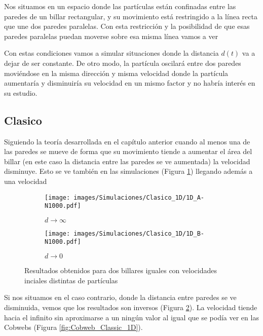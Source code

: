 Nos situamos en un espacio donde las partículas están confinadas entre las paredes de un billar rectangular, y su movimiento está restringido a la línea recta que une dos paredes paralelas. Con esta restricción y la posibilidad de que esas paredes paralelas puedan moverse sobre esa misma línea vamos a ver 

\vspace{3mm}

Con estas condiciones vamos a simular situaciones donde la distancia \( d(t) \) va a dejar de ser constante. De otro modo, la partícula oscilará entre dos paredes moviéndose en la misma dirección y misma velocidad donde la partícula aumentaría y disminuiría su velocidad en un mismo factor y no habría interés en su estudio.

\subsection{Clasico}

Siguiendo la teoría desarrollada en el capítulo anterior cuando al menos una de las paredes se mueve de forma que su movimiento tiende a aumentar el área del billar (en este caso la distancia entre las paredes se ve aumentada) la velocidad disminuye. Esto se ve también en las simulaciones (Figura \ref{fig:clasico_1D_A}) llegando además a una velocidad 

\begin{figure}[!h]
    \begin{subfigure}[b]{0.5\textwidth}
        \centering
        \texttt{[image: images/Simulaciones/Clasico\_1D/1D\_A-N1000.pdf]}
        \caption{\( d \rightarrow \infty \)}
        \label{fig:clasico_1D_A}
    \end{subfigure}
    \hfill
    \begin{subfigure}[b]{0.5\textwidth}
        \centering
        \texttt{[image: images/Simulaciones/Clasico\_1D/1D\_B-N1000.pdf]}
        \caption{\( d \rightarrow 0 \)}
        \label{fig:clasico_1D_B}
    \end{subfigure}
    \caption{Resultados obtenidos para dos billares iguales con velocidades inciales distintas de partículas}
    \label{fig:clasico_1D}
\end{figure}

Si nos situamos en el caso contrario, donde la distancia entre paredes se ve disminuida, vemos que los resultados son inversos (Figura \ref{fig:clasico_1D_B}). La velocidad tiende hacia el infinito sin aproximarse a un ningún valor al igual que se podía ver en las Cobwebs (Figura \ref{fig:Cobweb_Classic_1D}). 

